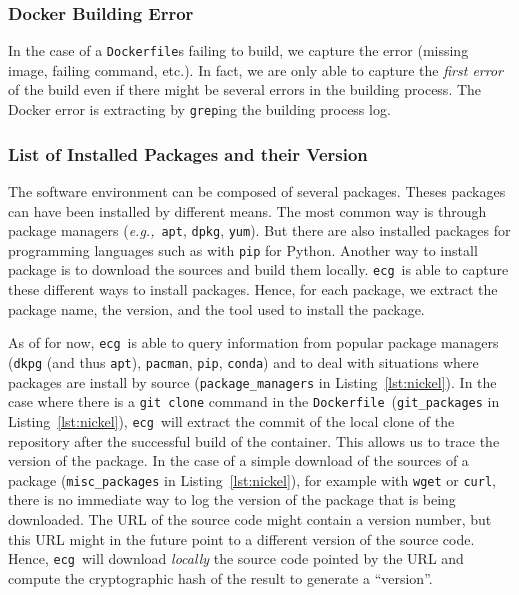 \documentclass[sigconf,natbib=false]{acmart}
\newcommand{\eg}{\emph{e.g.,}}
\newcommand{\df}{\texttt{Dockerfile}}
\newcommand{\ecg}{\texttt{ecg}}
\begin{document}
\subsubsection{Docker Building Error}

In the case of a \df s failing to build, we capture the error (missing image, failing command, etc.).
In fact, we are only able to capture the \emph{first error} of the build even if there might be several errors in the building process.
The Docker error is extracting by \texttt{grep}ing the building process log.

\subsubsection{List of Installed Packages and their Version}

The software environment can be composed of several packages.
Theses packages can have been installed by different means.
The most common way is through package managers (\eg\ \texttt{apt}, \texttt{dpkg}, \texttt{yum}).
But there are also installed packages for programming languages such as with \texttt{pip} for Python.
Another way to install package is to download the sources and build them locally.
\ecg\ is able to capture these different ways to install packages.
Hence, for each package, we extract the package name, the version, and the tool used to install the package.

As of for now, \ecg\ is able to query information from popular package managers (\texttt{dkpg} (and thus \texttt{apt}), \texttt{pacman}, \texttt{pip}, \texttt{conda}) and to deal with situations where packages are install by source (\texttt{package\_managers} in Listing~\ref{lst:nickel}).
In the case where there is a \texttt{git clone} command in the \df\ (\texttt{git\_packages} in Listing~\ref{lst:nickel}), \ecg\ will extract the commit of the local clone of the repository after the successful build of the container.
This allows us to trace the version of the package.
In the case of a simple download of the sources of a package (\texttt{misc\_packages} in Listing~\ref{lst:nickel}), for example with \texttt{wget} or \texttt{curl}, there is no immediate way to log the version of the package that is being downloaded.
The URL of the source code might contain a version number, but this URL might in the future point to a different version of the source code.
Hence, \ecg\ will download \emph{locally} the source code pointed by the URL and compute the cryptographic hash of the result to generate a ``version''.
\end{document}
